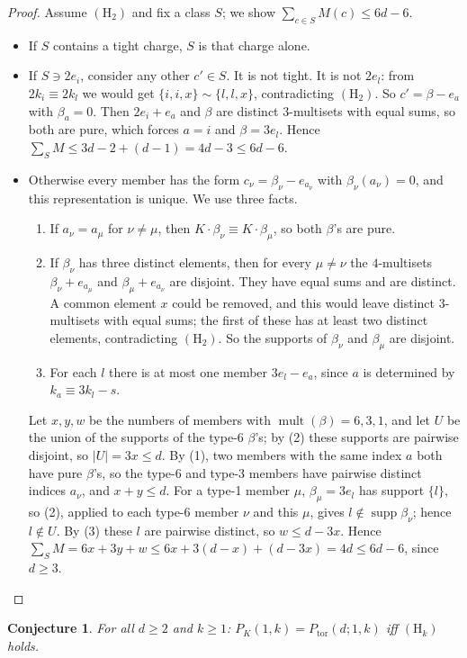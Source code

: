 \documentclass[11pt]{article}
\newcommand{\mult}{\operatorname{mult}}
\newcommand{\Ptor}{P_{\mathrm{tor}}}
\newtheorem{conjecture}[theorem]{Conjecture}
\theoremstyle{definition}
\theoremstyle{remark}
\begin{document}
\begin{proof}
Assume $(\mathrm H_2)$ and fix a class $S$; we show $\sum_{c\in S}M(c)\le6d-6$.
\begin{itemize}
\item If $S$ contains a tight charge, $S$ is that charge alone.
\item If $S\ni2e_i$, consider any other $c'\in S$. It is not tight. It is not $2e_l$: from $2k_i\equiv2k_l$ we would get
$\{i,i,x\}\sim\{l,l,x\}$, contradicting $(\mathrm H_2)$. So $c'=\beta-e_a$ with $\beta_a=0$. Then $2e_i+e_a$ and $\beta$ are distinct
$3$-multisets with equal sums, so both are pure, which forces $a=i$ and $\beta=3e_l$. Hence $\sum_SM\le3d-2+(d-1)=4d-3\le6d-6$.
\item Otherwise every member has the form $c_\nu=\beta_\nu-e_{a_\nu}$ with $\beta_\nu(a_\nu)=0$, and this representation is unique. We use
three facts.
\begin{enumerate}
\item[(1)] If $a_\nu=a_\mu$ for $\nu\ne\mu$, then $K\cdot\beta_\nu\equiv K\cdot\beta_\mu$, so both $\beta$'s are pure.
\item[(2)] If $\beta_\nu$ has three distinct elements, then for every $\mu\ne\nu$ the $4$-multisets $\beta_\nu+e_{a_\mu}$ and
$\beta_\mu+e_{a_\nu}$ are disjoint. They have equal sums and are distinct. A common element $x$ could be removed, and this would
leave distinct $3$-multisets with equal sums; the first of these has at least two distinct elements, contradicting $(\mathrm H_2)$. So the
supports of $\beta_\nu$ and $\beta_\mu$ are disjoint.
\item[(3)] For each $l$ there is at most one member $3e_l-e_a$, since $a$ is determined by $k_a\equiv3k_l-s$.
\end{enumerate}
Let $x,y,w$ be the numbers of members with $\mult(\beta)=6,3,1$, and let $U$ be the union of the supports of the type-6 $\beta$'s; by (2)
these supports are pairwise disjoint, so $|U|=3x\le d$. By (1), two members with the same index $a$ both have pure $\beta$'s, so the type-6
and type-3 members have pairwise distinct indices $a_\nu$, and $x+y\le d$. For a type-1 member $\mu$, $\beta_\mu=3e_l$ has support $\{l\}$, so (2), applied to each type-6 member $\nu$ and this $\mu$, gives
$l\notin\operatorname{supp}\beta_\nu$; hence $l\notin U$. By (3) these $l$ are pairwise distinct, so $w\le d-3x$. Hence $\sum_SM=6x+3y+w\le6x+3(d-x)+(d-3x)=4d\le6d-6$, since $d\ge3$.
\end{itemize}
\end{proof}

\begin{conjecture}\label{conj:t1H}
For all $d\ge2$ and $k\ge1$: $P_K(1,k)=\Ptor(d;1,k)$ iff $(\mathrm H_k)$ holds.
\end{conjecture}
\end{document}
